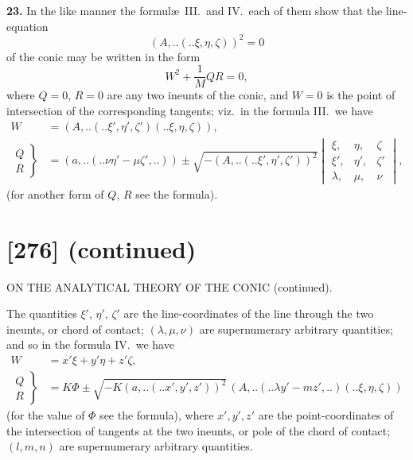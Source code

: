 \documentclass[12pt,a4paper]{article}
\newcommand{\qform}[2]{(#1 \mathbin{..} #2)}
\theoremstyle{definition}
\begin{document}
\textbf{23.} In the like manner the formul\ae\ III.\ and IV.\ each of them show that the line-equation
\[
(A,..\!\qform{}{\xi, \eta, \zeta})^{2} = 0
\]
of the conic may be written in the form
\[
W^{2} + \frac{1}{M}QR = 0,
\]
where $Q = 0$, $R = 0$ are any two ineunts of the conic, and $W = 0$ is the point of intersection of the corresponding tangents; viz.\ in the formula III.\ we have
\begin{align*}
W &= (A,..\!\qform{}{\xi', \eta', \zeta'}\!\qform{}{\xi, \eta, \zeta}),\\
\left.\begin{array}{c} Q \\ R \end{array}\right\}
&= (a,..\!\qform{}{\nu\eta' - \mu\zeta',..})
\pm \sqrt{-(A,..\!\qform{}{\xi', \eta', \zeta'})^{2}}
\begin{vmatrix}
\xi, & \eta, & \zeta \\
\xi', & \eta', & \zeta' \\
\lambda, & \mu, & \nu
\end{vmatrix},
\end{align*}
(for another form of $Q$, $R$ see the formula).

\newpage
\section*{[276] (continued)}
\begin{center}
{\large ON THE ANALYTICAL THEORY OF THE CONIC (continued).}
\end{center}

The quantities $\xi'$, $\eta'$, $\zeta'$ are the line-coordinates of the line through the two ineunts, or chord of contact; $(\lambda, \mu, \nu)$ are supernumerary arbitrary quantities; and so in the formula IV.\ we have
\begin{align*}
W &= x'\xi + y'\eta + z'\zeta,\\
\left.\begin{array}{c} Q \\ R \end{array}\right\}
&= K\Phi \pm \sqrt{-K(a,..\!\qform{}{x', y', z'})^{2}}\,(A,..\!\qform{}{\lambda y' - mz',..}\!\qform{}{\xi, \eta, \zeta})
\end{align*}
(for the value of $\Phi$ see the formula), where $x', y', z'$ are the point-coordinates of the intersection of tangents at the two ineunts, or pole of the chord of contact; $(l, m, n)$ are supernumerary arbitrary quantities.
\end{document}
